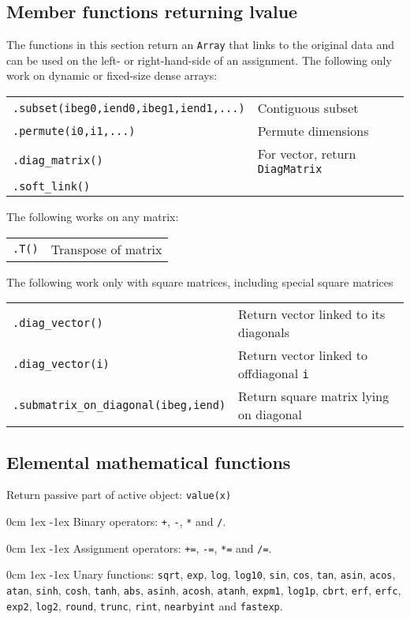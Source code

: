 \documentclass[10pt,a4,landscape]{article}
\def\hangingpar{\parshape 2 0cm \linewidth 1ex \dimexpr\linewidth-1ex\relax}
\def\code#1{\texttt{#1}}
\begin{document}
\subsection*{Member functions returning lvalue}
The functions in this section return an \code{Array} that links to the
original data and can be used on the left- or right-hand-side of an
assignment. The following only work on dynamic or fixed-size dense
arrays:\\
\begin{tabular}{ll}
\code{.subset(ibeg0,iend0,ibeg1,iend1,...)} & Contiguous subset\\
\code{.permute(i0,i1,...)} & Permute dimensions\\
\code{.diag\_matrix()} & For vector, return \code{DiagMatrix}\\
\code{.soft\_link()} \\
\end{tabular}

The following works on any matrix:\\
\begin{tabular}{ll}
\code{.T()} & Transpose of matrix\\
\end{tabular}

The following work only with square matrices, including special square
matrices\\
\begin{tabular}{ll}
\code{.diag\_vector()} & Return vector linked to its diagonals\\
\code{.diag\_vector(i)} & Return vector linked to offdiagonal \code{i}\\
\code{.submatrix\_on\_diagonal(ibeg,iend)} & Return square matrix lying on diagonal\\
\end{tabular}
\subsection*{Elemental mathematical functions}
Return passive part of active object: \code{value(x)}

\hangingpar
Binary operators: \code{+}, \code{-},
  \code{*} and \code{/}.

\hangingpar
Assignment operators:  \code{+=}, \code{-=}, \code{*=} and \code{/=}.

\hangingpar
Unary functions: \code{sqrt}, \code{exp},
  \code{log}, \code{log10}, \code{sin}, \code{cos}, \code{tan},
  \code{asin}, \code{acos}, \code{atan}, \code{sinh}, \code{cosh},
  \code{tanh}, \code{abs}, \code{asinh}, \code{acosh}, \code{atanh},
  \code{expm1}, \code{log1p}, \code{cbrt}, \code{erf}, \code{erfc},
  \code{exp2}, \code{log2}, \code{round}, \code{trunc}, \code{rint},
  \code{nearbyint} and \code{fastexp}.
\end{document}
